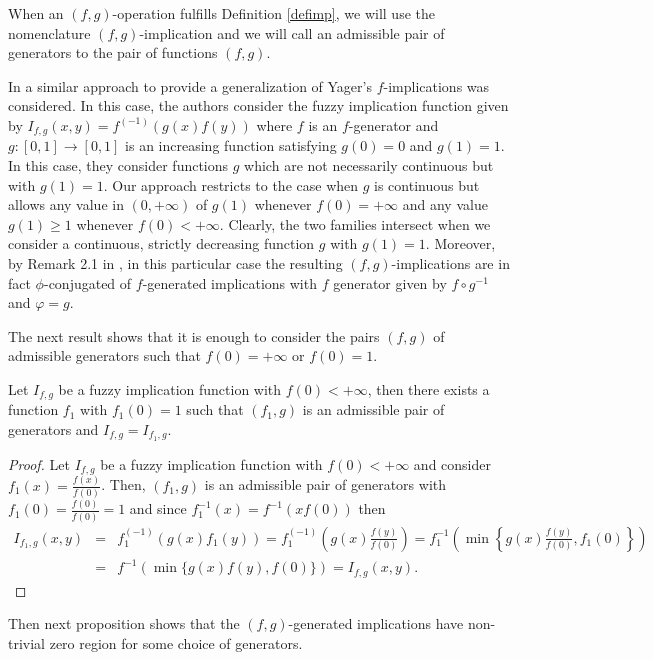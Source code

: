 When an $(f,g)$-operation fulfills Definition \ref{defimp}, we will use the nomenclature $(f,g)$-implication and we will call an admissible pair of generators to the pair of functions $(f,g)$.
\begin{remark}\label{Remark:Comparison(f,g)}
	In \cite{XieLiu2013} a similar approach to provide a generalization of Yager's $f$-implications was considered. In this case, the authors consider the fuzzy implication function given by $I_{f,g}(x,y)=f^{(-1)}(g(x)f(y))$ where  $f$ is an $f$-generator and $g:[0,1] \to [0,1]$ is an increasing function satisfying $g(0)=0$ and $g(1)=1$. In this case, they consider functions $g$ which are not necessarily continuous but with $g(1)=1$. Our approach restricts to the case when $g$ is continuous but allows any value in $(0,+\infty)$ of $g(1)$ whenever $f(0)=+\infty$ and any value $g(1) \geq 1$ whenever $f(0)<+\infty$. Clearly, the two families intersect when we consider a continuous, strictly decreasing function $g$ with $g(1)=1$. Moreover, by Remark 2.1 in \cite{XieLiu2013}, in this particular case the resulting $(f,g)$-implications are in fact $\phi$-conjugated of $f$-generated implications with $f$ generator given by $f \circ g^{-1}$ and $\varphi=g$.
\end{remark}
The next result shows that it is enough to consider the pairs $(f,g)$ of admissible generators such that $f(0)=+\infty$ or $f(0)=1$.
\begin{proposition} Let $I_{f,g}$ be a fuzzy implication function with $f(0) < +\infty$, then there exists a function $f_1$ with $f_1(0)=1$ such that $(f_1,g)$ is an admissible pair of generators and $I_{f,g}=I_{f_1,g}$.
\end{proposition}
\begin{proof}
	Let $I_{f,g}$ be a fuzzy implication function with $f(0) < + \infty$ and consider $f_1(x)=\frac{f(x)}{f(0)}$. Then, $(f_1,g)$ is an admissible pair of generators with $f_1(0)=\frac{f(0)}{f(0)}=1$ and since $f_1^{-1}(x) = f^{-1}(xf(0))$ then
	\begin{eqnarray*}
		I_{f_1,g}(x,y)&=&f_1^{(-1)}\left(g(x)f_1(y)\right) = f_1^{(-1)}\left(g(x)\frac{f(y)}{f(0)}\right) =  f_1^{-1} \left( \min \left\lbrace g(x)\frac{f(y)}{f(0)},f_1(0)\right \rbrace\right) \\
		&=& f^{-1}\left( \min \{ g(x)f(y), f(0) \}\right) = I_{f,g}(x,y).
	\end{eqnarray*}
\end{proof}


Then next proposition shows that the $(f,g)$-generated implications have non-trivial zero region for some choice of generators.


